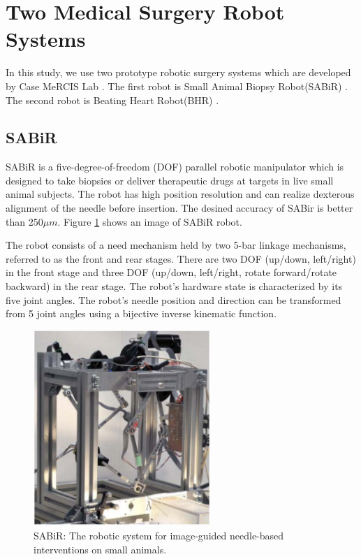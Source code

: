 \section{Two Medical Surgery Robot Systems }\label{secrobot}
In this study, we use two prototype robotic surgery systems which are developed by Case MeRCIS Lab \cite{}. The first robot is Small Animal Biopsy Robot(SABiR) \cite{}. The second robot is Beating Heart Robot(BHR) \cite{}.

\subsection {SABiR}
SABiR is a five-degree-of-freedom (DOF) parallel robotic manipulator which is designed to take biopsies or deliver therapeutic drugs at targets in live small animal subjects. The robot has high position resolution and can realize dexterous alignment of  the needle before insertion. The desined accuracy of SABir is better than 250${\mu}m$. Figure \ref{sabir} shows an image of SABiR robot. 

The robot consists of a need mechanism held by two 5-bar linkage mechanisms, referred to as the front and rear stages. There are two DOF (up/down, left/right) in the front stage and three DOF (up/down, left/right, rotate forward/rotate backward) in the rear stage. The robot's hardware state is characterized by its five joint angles. The robot’s needle position and direction can be transformed from 5 joint angles using a bijective inverse kinematic function.

\begin{figure}[!thpb]
\centering
\includegraphics[width=0.6\textwidth]{chapter5_SABiR.pdf}
\caption{SABiR: The robotic system for image-guided needle-based interventions on small animals.}
\label{sabir}
\end{figure}

